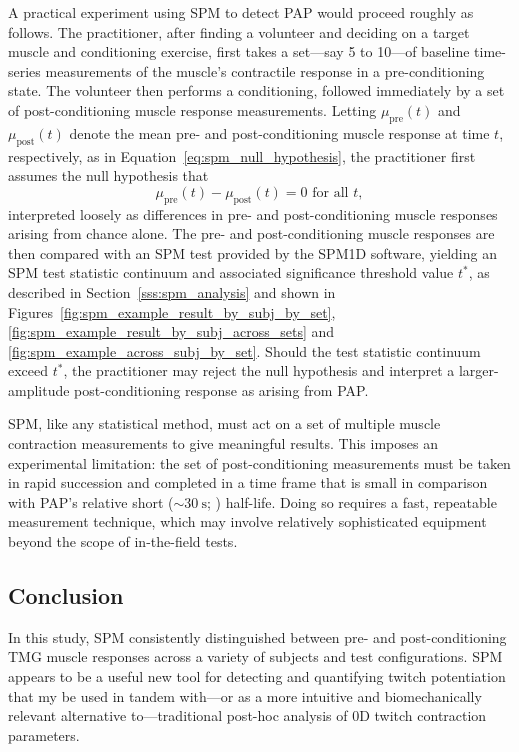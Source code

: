 \documentclass[utf8]{FrontiersinHarvard}
\begin{document}
A practical experiment using SPM to detect PAP would proceed roughly as follows.
The practitioner, after finding a volunteer and deciding on a target muscle and conditioning exercise, first takes a set---say 5 to 10---of baseline time-series measurements of the muscle's contractile response in a pre-conditioning state.
The volunteer then performs a conditioning, followed immediately by a set of post-conditioning muscle response measurements.
Letting $ \mu_{\mathrm{pre}}(t) $ and $ \mu_{\mathrm{post}}(t) $ denote the mean pre- and post-conditioning muscle response at time $ t $, respectively, as in Equation~\ref{eq:spm_null_hypothesis},
the practitioner first assumes the null hypothesis that
\begin{equation*}
    \mu_{\mathrm{pre}} (t) - \mu_{\mathrm{post}} (t) = 0 \text{ for all } t,
\end{equation*}
interpreted loosely as differences in pre- and post-conditioning muscle responses arising from chance alone.
The pre- and post-conditioning muscle responses are then compared with an SPM test provided by the SPM1D software, yielding an SPM test statistic continuum and associated significance threshold value $ t^{*} $, as described in Section~\ref{sss:spm_analysis} and shown in Figures~\ref{fig:spm_example_result_by_subj_by_set}, \ref{fig:spm_example_result_by_subj_across_sets} and \ref{fig:spm_example_across_subj_by_set}.
Should the test statistic continuum exceed $ t^{*} $, the practitioner may reject the null hypothesis and interpret a larger-amplitude post-conditioning response as arising from PAP.

SPM, like any statistical method, must act on a set of multiple muscle contraction measurements to give meaningful results.
This imposes an experimental limitation: the set of post-conditioning measurements must be taken in rapid succession and completed in a time frame that is small in comparison with PAP's relative short ($ \sim \SI{30}{\second} $; \cite{vandervoort}) half-life.
Doing so requires a fast, repeatable measurement technique, which may involve relatively sophisticated equipment beyond the scope of in-the-field tests.

\subsection{Conclusion}
In this study, SPM consistently distinguished between pre- and post-conditioning TMG muscle responses across a variety of subjects and test configurations.
SPM appears to be a useful new tool for detecting and quantifying twitch potentiation that my be used in tandem with---or as a more intuitive and biomechanically relevant alternative to---traditional post-hoc analysis of 0D twitch contraction parameters.
\end{document}
